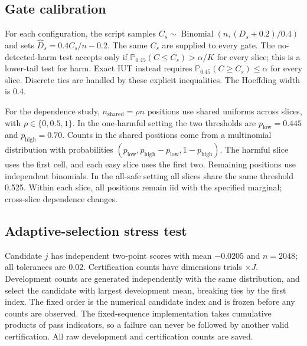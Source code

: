 \documentclass[11pt,letterpaper]{article}
\newcommand{\Prb}{\mathbb{P}}
\begin{document}
\subsection{Gate calibration}
For each configuration, the script samples $C_s\sim\operatorname{Binomial}(n,(D_s+0.2)/0.4)$ and sets $\widehat D_s=0.4C_s/n-0.2$. The same $C_s$ are supplied to every gate. The no-detected-harm test accepts only if $\Prb_{0.45}(C\leq C_s)>\alpha/K$ for every slice; this is a lower-tail test for harm. Exact IUT instead requires $\Prb_{0.45}(C\geq C_s)\leq\alpha$ for every slice. Discrete ties are handled by these explicit inequalities. The Hoeffding width is 0.4.

For the dependence study, $n_{\mathrm{shared}}=\rho n$ positions use shared uniforms across slices, with $\rho\in\{0,0.5,1\}$. In the one-harmful setting the two thresholds are $p_{\mathrm{low}}=0.445$ and $p_{\mathrm{high}}=0.70$. Counts in the shared positions come from a multinomial distribution with probabilities
$(p_{\mathrm{low}},p_{\mathrm{high}}-p_{\mathrm{low}},1-p_{\mathrm{high}})$. The harmful slice uses the first cell, and each easy slice uses the first two. Remaining positions use independent binomials. In the all-safe setting all slices share the same threshold 0.525. Within each slice, all positions remain iid with the specified marginal; cross-slice dependence changes.

\begin{table}[ht]
\centering\small

\caption{Completed sample-size study: release rates (\%) over \CalTrials\ trials per configuration. ``Harm'' is the one-harmful-slice scenario, so release is an error; ``Safe'' has every slice at mean 0.01, so release measures power. IUT uses exact binomial tests. The last column uses exact marginal tests at level $\alpha/K$.}
\end{table}

\begin{table}[ht]
\centering\small

\caption{Release rates (\%) with shared latent observations, $K=32,n=512$. Marginal score distributions are unchanged. Strong dependence can substantially change joint acceptance without invalidating the IUT argument.}
\end{table}

\subsection{Adaptive-selection stress test}
Candidate $j$ has independent two-point scores with mean $-0.0205$ and $n=2048$; all tolerances are 0.02. Certification counts have dimensions trials $\times J$. Development counts are generated independently with the same distribution, and select the candidate with largest development mean, breaking ties by the first index. The fixed order is the numerical candidate index and is frozen before any counts are observed. The fixed-sequence implementation takes cumulative products of pass indicators, so a failure can never be followed by another valid certification. All raw development and certification counts are saved.
\end{document}
